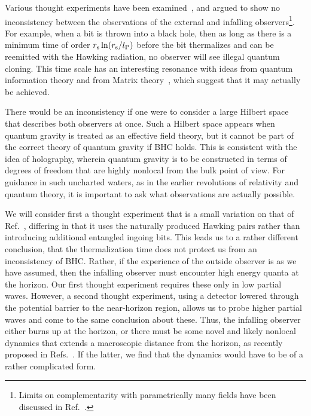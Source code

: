 \documentclass[12pt]{article}
\begin{document}

Various thought experiments have been examined~\cite{Susskind:1993mu,Preskill}, and argued to show no inconsistency between the observations of the external and infalling observers\footnote{Limits on complementarity with parametrically many fields have been discussed in Ref.~\cite{Yeom:2009zp}.}.  For example, when a bit is thrown into a black hole, then as long as there is a minimum time of order $r_{\rm s} \ln (r_{\rm s}/l_{\rm P})$ before the bit thermalizes and can be reemitted with the Hawking radiation, no observer will see illegal quantum cloning.
This time scale has an interesting resonance with ideas from quantum information theory and from Matrix theory~\cite{Hayden:2007cs,Sekino:2008he,Barbon:2011pn,Lashkari:2011yi}, which suggest that it may actually be achieved.

There would be an inconsistency if one were to consider a large Hilbert space that describes both observers at once.  Such a Hilbert space appears when quantum gravity is treated as an effective field theory, but it cannot be part of the correct theory of quantum gravity if BHC holds.  This is consistent with the idea of holography, wherein quantum gravity is to be constructed in terms of degrees of freedom that are highly nonlocal from the bulk point of view.  For guidance in such uncharted waters, as in the earlier revolutions of relativity and quantum theory, it is important to ask what observations are actually possible.

We will consider first a thought experiment that is a small variation on that of Ref.~\cite{Susskind:1993mu}, differing in that it uses the naturally produced Hawking pairs rather than introducing additional entangled ingoing bits.  This leads us to a rather different conclusion, that the thermalization time does not protect us from an inconsistency of BHC.  Rather, if the experience of the outside observer is as we have assumed, then the infalling observer must encounter high energy quanta at the horizon.  Our first thought experiment requires these only in low partial waves.  However, a second thought experiment, using a detector lowered through the potential barrier to the near-horizon region, allows us to probe higher partial waves and come to the same conclusion about these.  Thus, the infalling observer either burns up at the horizon, or there must be some novel and likely nonlocal dynamics that extends a macroscopic distance from the horizon, as recently proposed in Refs.~\cite{Giddings:2011ks}.  If the latter, we find that the dynamics would have to be of a rather complicated form.
\end{document}
